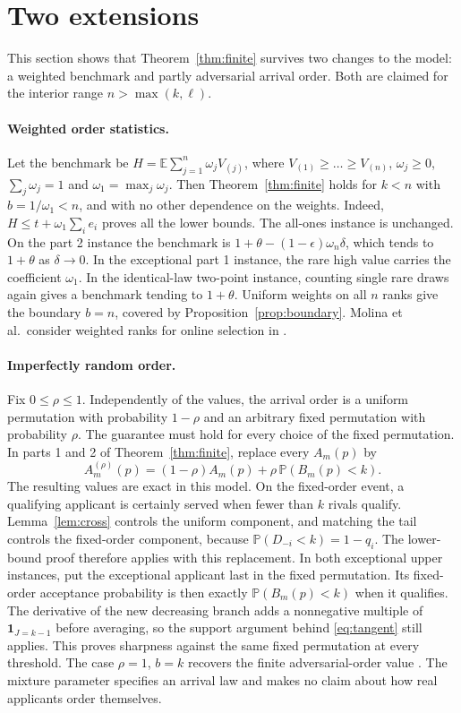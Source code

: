 \documentclass[11pt,a4paper]{article}
\theoremstyle{remark}
\newcommand{\E}{\mathbb E}
\newcommand{\Prob}{\mathbb P}
\begin{document}


\section{Two extensions}\label{sec:weights}
This section shows that Theorem~\ref{thm:finite} survives two changes to the model: a weighted benchmark and partly adversarial arrival order. Both are claimed for the interior range $n>\max(k,\ell)$.

\paragraph{Weighted order statistics.}
Let the benchmark be $H=\E\sum_{j=1}^n\omega_jV_{(j)}$, where $V_{(1)}\ge\dots\ge V_{(n)}$, $\omega_j\ge0$, $\sum_j\omega_j=1$ and $\omega_1=\max_j\omega_j$. Then Theorem~\ref{thm:finite} holds for $k<n$ with $b=1/\omega_1<n$, and with no other dependence on the weights. Indeed, $H\le t+\omega_1\sum_ie_i$ proves all the lower bounds. The all-ones instance is unchanged. On the part 2 instance the benchmark is $1+\theta-(1-\epsilon)\omega_n\delta$, which tends to $1+\theta$ as $\delta\to0$. In the exceptional part 1 instance, the rare high value carries the coefficient $\omega_1$. In the identical-law two-point instance, counting single rare draws again gives a benchmark tending to $1+\theta$. Uniform weights on all $n$ ranks give the boundary $b=n$, covered by Proposition~\ref{prop:boundary}. Molina et al.\ consider weighted ranks for online selection in \cite[\S7.1]{mg}.

\paragraph{Imperfectly random order.}
Fix $0\le\rho\le1$. Independently of the values, the arrival order is a uniform permutation with probability $1-\rho$ and an arbitrary fixed permutation with probability $\rho$. The guarantee must hold for every choice of the fixed permutation. In parts 1 and 2 of Theorem~\ref{thm:finite}, replace every $A_m(p)$ by
\[
 A_m^{(\rho)}(p)=(1-\rho)A_m(p)+\rho\,\Prob(B_m(p)<k).
\]
The resulting values are exact in this model. On the fixed-order event, a qualifying applicant is certainly served when fewer than $k$ rivals qualify. Lemma~\ref{lem:cross} controls the uniform component, and matching the tail controls the fixed-order component, because $\Prob(D_{-i}<k)=1-q_i$. The lower-bound proof therefore applies with this replacement. In both exceptional upper instances, put the exceptional applicant last in the fixed permutation. Its fixed-order acceptance probability is then exactly $\Prob(B_m(p)<k)$ when it qualifies. The derivative of the new decreasing branch adds a nonnegative multiple of $\mathbf1_{J=k-1}$ before averaging, so the support argument behind \eqref{eq:tangent} still applies. This proves sharpness against the same fixed permutation at every threshold. The case $\rho=1$, $b=k$ recovers the finite adversarial-order value \cite[equation~(21)]{jmz}. The mixture parameter specifies an arrival law and makes no claim about how real applicants order themselves.
\end{document}
